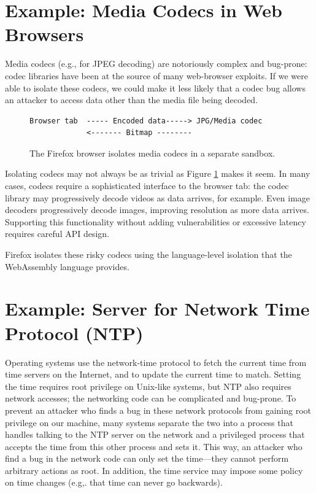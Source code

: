 \section{Example: Media Codecs in Web Browsers}\label{sec:split:codec}
Media codecs (e.g., for JPEG decoding) are notoriously complex and bug-prone:
codec libraries have been at the source of many web-browser exploits. 
If we were able to isolate these codecs, we could
make it less likely that a codec bug allows an attacker to
access data other than the media file being decoded.

\begin{figure}
\begin{verbatim}
Browser tab  ----- Encoded data-----> JPG/Media codec
             <------- Bitmap -------- 
\end{verbatim}
\caption{The Firefox browser isolates media codecs
in a separate sandbox.}\label{fig:codec}
\end{figure}

Isolating codecs may not always be as trivial as Figure \ref{fig:codec} makes it seem.
In many cases, codecs require a sophisticated interface to the browser tab: the
codec library may progressively decode videos as data arrives, for example. 
Even image decoders progressively decode images, improving resolution as more data arrives. Supporting this functionality without adding vulnerabilities or excessive 
latency requires careful API design.

Firefox isolates these risky codecs using
the language-level isolation that the WebAssembly language provides.

\section{Example: Server for Network Time Protocol (NTP)}
Operating systems use the network-time protocol
to fetch the current time from time servers on 
the Internet, and to update the current
time to match. 
Setting the time requires root
privilege on Unix-like systems, but NTP also
requires network accesses; 
the networking code can be complicated
and bug-prone. To prevent an attacker who finds
a bug in these network protocols from gaining root
privilege on our machine, many systems separate
the two into a process that handles talking to the
NTP server on the network and a privileged process
that accepts the time from this other process and
sets it. This way, an attacker who find a bug in
the network code can only set the time---they
cannot perform arbitrary actions as root.
In addition, the time service may impose some
policy on time changes (e.g,. that time can never
go backwards). 

